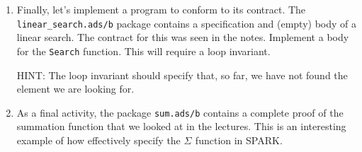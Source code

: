 \documentclass{article}
\begin{document}
\begin{enumerate}
 \item Finally, let's implement a program to conform to its contract. The \texttt{linear\_search.ads/b} package contains a specification and (empty) body of a linear search. The contract for this was seen in the notes. Implement a body for the \texttt{Search} function. This will require a loop invariant.

  HINT: The loop invariant should specify that, so far, we have not found the element we are looking for.

\item As a final activity, the package \texttt{sum.ads/b} contains a complete proof of the summation function that we looked at in the lectures. This is an interesting example of how effectively specify the $\Sigma_{}$ function in SPARK.

\end{enumerate}
\end{document}
